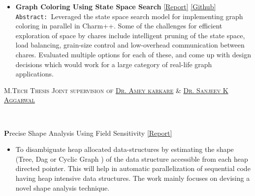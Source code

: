 \documentclass[9pt]{article}
\newenvironment{changemargin}[2]{%
  \begin{list}{}{%
    \setlength{\topsep}{0pt}%
    \setlength{\leftmargin}{#1}%
    \setlength{\rightmargin}{#2}%
    \setlength{\listparindent}{\parindent}%
    \setlength{\itemindent}{\parindent}%
    \setlength{\parsep}{\parskip}%
  }%
  \item[]}{\end{list}
}
\newcommand{\lineover}{
	\begin{changemargin}{-0.05in}{-0.05in}
		\vspace*{-8pt}
		\hrulefill \\
		\vspace*{-2pt}
	\end{changemargin}
}
\newcommand{\header}[1]{
	\begin{changemargin}{-0.5in}{-0.5in}
		\scshape{#1}\\
  	\lineover
	\end{changemargin}
}
\newenvironment{body} {
	\vspace*{-16pt}
	\begin{changemargin}{-0.25in}{-0.5in}
  }	
	{\end{changemargin}
}
\begin{document}
\begin{body}
\begin{itemize}
           \item \textbf{Graph Coloring Using State Space Search} 
           \href{http://web.engr.illinois.edu/~sdasgup3/Document/CS598_project_proposal.pdf}{[Report]}  
           \href{https://github.com/sdasgup3/parallel-sudoku}{[Github]} \\          
                                  \texttt{Abstract: }Leveraged the state space
                                  search model for implementing graph coloring
                                  in parallel in Charm++. Some of the
                                  challenges for efficient exploration of space
                                  by chares include intelligent pruning of the
                                  state space, load balancing, grain-size
                                  control and low-overhead communication
                                  between chares. Evaluated multiple options
                                  for each of these, and come up with design
                                  decisions which would work for a large
                                  category of real-life graph applications.
	\end{itemize}
\end{body}

\smallskip

\header{M.Tech Thesis \hfill Joint supervision of \href{http://www.cse.iitk.ac.in/users/karkare/}{Dr. Amey karkare} \& \href{http://www.cse.iitk.ac.in/users/ska/}{Dr.  Sanjeev K Aggarwal} }

\begin{body}
	\vspace{14pt}
	\textbf Precise Shape Analysis Using Field Sensitivity {\href{http://www.cse.iitk.ac.in/users/karkare/MTP/2010-11/sandeep2010precise.pdf}{[Report]}} \\
		\begin{itemize} \itemsep -0pt  
		\item[] To disambiguate heap allocated data-structures by estimating the shape (Tree, Dag or Cyclic Graph ) of the data structure 
			accessible from each heap directed pointer. This will help in automatic parallelization of sequential code having heap 
			intensive data structures. The work mainly focuses on devising a novel shape analysis technique. 
		\end{itemize}
\end{body}
\end{document}
